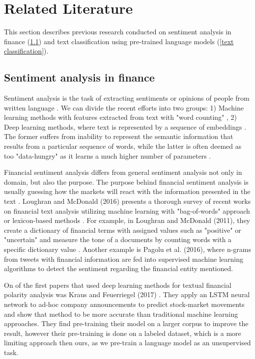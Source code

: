 \documentclass[../main.tex]{subfiles}
\begin{document}
\section{Related Literature} \label{sec:related_lit}
This section describes previous research conducted on sentiment analysis in finance (\ref{sentiment analysis in finance}) and text classification using pre-trained language models (\ref{text classification}).

\subsection{Sentiment analysis in finance} \label{sentiment analysis in finance}
Sentiment analysis is the task of extracting sentiments or opinions of people from written language \cite{Liu2012}. We can divide the recent efforts into two groups: 1) Machine learning methods with features extracted from text with "word counting" \cite{Agarwal2016,Whitelaw2005,conf/icwsm/MartineauF09,Tripathy2016}, 2) Deep learning methods, where text is represented by a sequence of embeddings \cite{Severyn2015,Araque2017,Zhang2018}. The former suffers from inability to represent the semantic information that results from a particular sequence of words, while the latter is often deemed as too "data-hungry" as it learns a much higher number of parameters \cite{2018arXiv180100631M}.  

Financial sentiment analysis differs from general sentiment analysis not only in domain, but also the purpose. The purpose behind financial sentiment analysis is usually guessing how the markets will react with the information presented in the text \cite{Li2014}. Loughran and McDonald (2016) presents a thorough survey of recent works on financial text analysis utilizing machine learning with "bag-of-words" approach or lexicon-based methods \cite{Loughran2016}. For example, in Loughran and McDonald (2011), they create a dictionary of financial terms with assigned values such as "positive" or "uncertain" and  measure the tone of a documents by counting words with a specific dictionary value  \cite{Loughran2011}. Another example is Pagolu et al. (2016), where n-grams from tweets with financial information are fed into supervised machine learning algorithms to detect the sentiment regarding the financial entity mentioned.

On of the first papers that used deep learning methods for textual financial polarity analysis was Kraus and Feuerriegel (2017) \cite{Kraus2017}. They apply an LSTM neural network to ad-hoc company announcements to predict stock-market movements and show that method to be more accurate than traditional machine learning approaches. They find pre-training their model on a larger corpus to improve the result, however their pre-training is done on a labeled dataset, which is a more limiting approach then ours, as we pre-train a language model as an unsupervised task.
\end{document}
